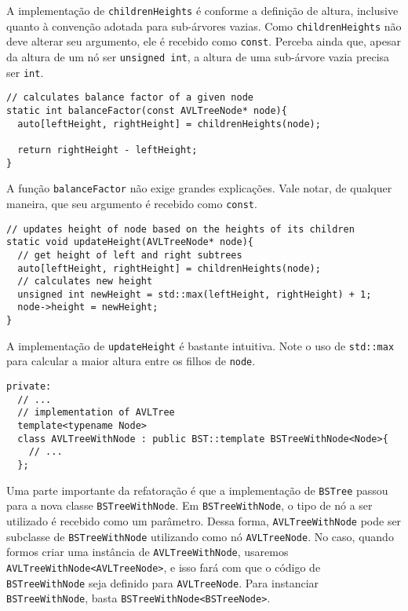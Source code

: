 \documentclass[11pt]{article}
\begin{document}
A implementação de \texttt{childrenHeights} é conforme a definição de
altura, inclusive quanto à convenção adotada para sub-árvores
vazias.  Como \texttt{childrenHeights} não deve alterar seu argumento,
ele é recebido como \texttt{const}.  Perceba ainda que, apesar da altura
de um nó ser \texttt{unsigned int}, a altura de uma sub-árvore vazia
precisa ser \texttt{int}.

\begin{verbatim}
// calculates balance factor of a given node
static int balanceFactor(const AVLTreeNode* node){
  auto[leftHeight, rightHeight] = childrenHeights(node);

  return rightHeight - leftHeight;
}
\end{verbatim}

A função \texttt{balanceFactor} não exige grandes explicações.  Vale
notar, de qualquer maneira, que seu argumento é recebido como
\texttt{const}.

\begin{verbatim}
// updates height of node based on the heights of its children
static void updateHeight(AVLTreeNode* node){
  // get height of left and right subtrees
  auto[leftHeight, rightHeight] = childrenHeights(node);
  // calculates new height
  unsigned int newHeight = std::max(leftHeight, rightHeight) + 1;
  node->height = newHeight;
}
\end{verbatim}

A implementação de \texttt{updateHeight} é bastante intuitiva.  Note o
uso de \texttt{std::max} para calcular a maior altura entre os filhos de
\texttt{node}.

\begin{verbatim}
private:
  // ...
  // implementation of AVLTree
  template<typename Node>
  class AVLTreeWithNode : public BST::template BSTreeWithNode<Node>{
    // ...
  };
\end{verbatim}

Uma parte importante da refatoração é que a implementação de
\texttt{BSTree} passou para a nova classe \texttt{BSTreeWithNode}.  Em
\texttt{BSTreeWithNode}, o tipo de nó a ser utilizado é recebido como um
parâmetro.  Dessa forma, \texttt{AVLTreeWithNode} pode ser subclasse de
\texttt{BSTreeWithNode} utilizando como nó \texttt{AVLTreeNode}.  No caso, quando
formos criar uma instância de \texttt{AVLTreeWithNode}, usaremos
\texttt{AVLTreeWithNode<AVLTreeNode>}, e isso fará com que o código de
\texttt{BSTreeWithNode} seja definido para \texttt{AVLTreeNode}.  Para
instanciar \texttt{BSTreeWithNode}, basta \texttt{BSTreeWithNode<BSTreeNode>}.
\end{document}
